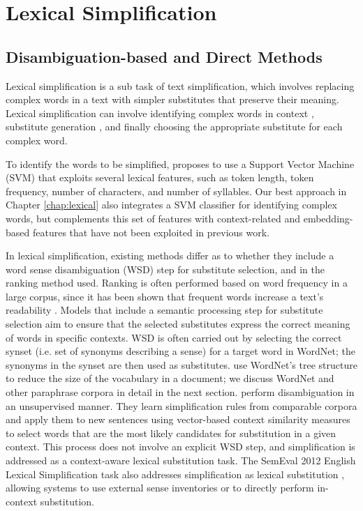 \documentclass[thesis.tex]{subfiles}
\begin{document}
\section{Lexical Simplification} \label{sec:lexical_review} 

\subsection{Disambiguation-based and Direct Methods}

Lexical simplification is a sub task of text simplification, which involves replacing complex words in a text with simpler substitutes that preserve their meaning. Lexical simplification can involve identifying complex words in context \citep{shardlow2013cw}, substitute generation \citep{biran2011putting}, and finally choosing the appropriate substitute for each complex word.

To identify the words to be simplified, \cite{shardlow2013comparison} proposes to use a Support Vector Machine (SVM) that exploits several lexical features, such as token length, token frequency, number of characters, and number of syllables. Our best approach in Chapter \ref{chap:lexical} also integrates a SVM classifier for identifying complex words, but complements this set of features with context-related and embedding-based features that have not been exploited in previous work.

In lexical simplification, existing methods differ as to whether they include a word sense disambiguation (WSD) step for substitute selection, and in the ranking method used. Ranking is often performed based on word frequency in a large corpus, since it has been shown that frequent words increase a text's readability \citep{devlin1998use,kauchak2013improving}. Models that include a semantic processing step for substitute selection aim to ensure that the selected substitutes express the correct meaning of words in specific contexts. WSD is often carried out by selecting the correct synset (i.e. set of synonyms describing a sense) for a target word in WordNet; the synonyms in the synset are then used as substitutes. \cite{konvens2012wordnet} use WordNet's tree structure to reduce the size of the vocabulary in a document; we discuss WordNet and other paraphrase corpora in detail in the next section. \cite{biran2011putting} perform disambiguation in an unsupervised manner. They learn simplification rules from comparable corpora and apply them to new sentences using vector-based context similarity measures to select words that are the most likely candidates for substitution in a given context. This process does not involve an explicit WSD step, and simplification is addressed as a context-aware lexical substitution task. The SemEval 2012 English Lexical Simplification task \citep{specia2012semeval} also addresses simplification as lexical substitution \citep{mccarthy2007semeval}, allowing systems to use external sense inventories or to directly perform in-context substitution.
\end{document}
